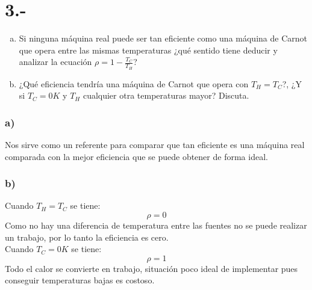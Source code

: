\documentclass{article}
\begin{document}
\section*{3.-}
\begin{enumerate}[a)]
    \item Si ninguna máquina real puede ser tan eficiente como una máquina de Carnot que opera entre las mismas 
    temperaturas ¿qué sentido tiene deducir y analizar la ecuación $\rho = 1- \frac{T_C}{T_H}$?
    \item ¿Qué eficiencia tendría una máquina de Carnot que opera con $T_H = T_C$?,
    ¿Y si $T_C=0K$ y $T_H$ cualquier otra temperaturas mayor? Discuta. 
\end{enumerate}
\begin{tcolorbox}[breakable]
    \subsubsection*{a)}
    Nos sirve como un referente para comparar que tan eficiente es una máquina real comparada con la 
    mejor eficiencia que se puede obtener de forma ideal.
    \subsubsection*{b)}
    Cuando $T_H = T_C$ se tiene:
    \[ \rho = 0\]
    Como no hay una diferencia de temperatura entre las fuentes no se puede realizar un trabajo, 
    por lo tanto la eficiencia es cero. \\ 
    Cuando $T_C=0K$ se tiene:
    \[ \rho = 1 \]
    Todo el calor se convierte en trabajo, situación poco ideal de implementar pues conseguir 
    temperaturas bajas es costoso.
\end{tcolorbox}
\end{document}
